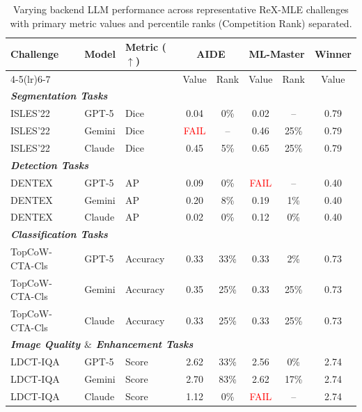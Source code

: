 \documentclass{midl} %
\begin{document}
\begin{table}[t]
\centering
\footnotesize	
\caption{Varying backend LLM performance across representative ReX-MLE challenges with primary metric values and percentile ranks (Competition Rank) separated.}
\setlength{\tabcolsep}{10pt}
\label{tab:agent_performance_models_split}
\begin{tabular}{l l l 
                c c 
                c c 
                c}
\toprule
\textbf{Challenge} & \textbf{Model} & \textbf{Metric ($\uparrow$)} 
& \multicolumn{2}{c}{\textbf{AIDE}} 
& \multicolumn{2}{c}{\textbf{ML-Master}} 
& \textbf{Winner} \\
\cmidrule(lr){4-5}\cmidrule(lr){6-7}
& & & Value & Rank & Value & Rank & Value \\
\midrule

\multicolumn{8}{l}{\textit{\textbf{Segmentation Tasks}}} \\
ISLES'22 & GPT-5  & Dice & 0.04 & 0\%  & 0.02 & --   & 0.79 \\
ISLES'22 & Gemini & Dice & \textcolor{red}{FAIL} & --   & 0.46 & 25\% & 0.79 \\
ISLES'22 & Claude & Dice & 0.45 & 5\%  & 0.65 & 25\%  & 0.79 \\
\midrule

\multicolumn{8}{l}{\textit{\textbf{Detection Tasks}}} \\
DENTEX & GPT-5  & AP & 0.09 & 0\%  & \textcolor{red}{FAIL} & --   & 0.40 \\
DENTEX & Gemini & AP & 0.20 & 8\%  & 0.19 & 1\%  & 0.40 \\
DENTEX & Claude & AP & 0.02 & 0\%  & 0.12 & 0\%  & 0.40 \\
\midrule

\multicolumn{8}{l}{\textit{\textbf{Classification Tasks}}} \\
TopCoW-CTA-Cls & GPT-5  & Accuracy & 0.33 & 33\% & 0.33 & 2\%  & 0.73 \\
TopCoW-CTA-Cls & Gemini & Accuracy & 0.35 & 25\% & 0.33 & 25\% & 0.73 \\
TopCoW-CTA-Cls & Claude & Accuracy & 0.33 & 25\% & 0.33 & 25\% & 0.73 \\
\midrule

\multicolumn{8}{l}{\textit{\textbf{Image Quality $\&$ Enhancement Tasks}}} \\
LDCT-IQA & GPT-5  & Score & 2.62 & 33\% & 2.56 & 0\%  & 2.74 \\
LDCT-IQA & Gemini & Score & 2.70 & 83\% & 2.62 & 17\% & 2.74 \\
LDCT-IQA & Claude & Score & 1.12 & 0\%  & \textcolor{red}{FAIL} & -- & 2.74 \\
\bottomrule
\end{tabular}
\end{table}
\end{document}
